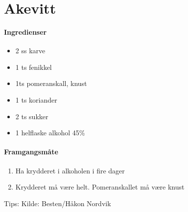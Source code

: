 \section{﻿Akevitt}
\label{akevitt}


\paragraph{Ingredienser}
\begin{itemize}[noitemsep]
	\item 2 ss karve
	\item 1 ts fenikkel
	\item 1ts pomeranskall, knust
	\item 1 ts koriander
	\item 2 ts sukker
	\item 1 helflaske alkohol 45\%
\end{itemize}

\paragraph{Framgangsmåte}
\begin{enumerate}[noitemsep]
	\item Ha krydderet i alkoholen i fire dager
	\item Krydderet må være helt. Pomeranskallet må være knust
\end{enumerate}

Tips:
Kilde: Besten/Håkon Nordvik
